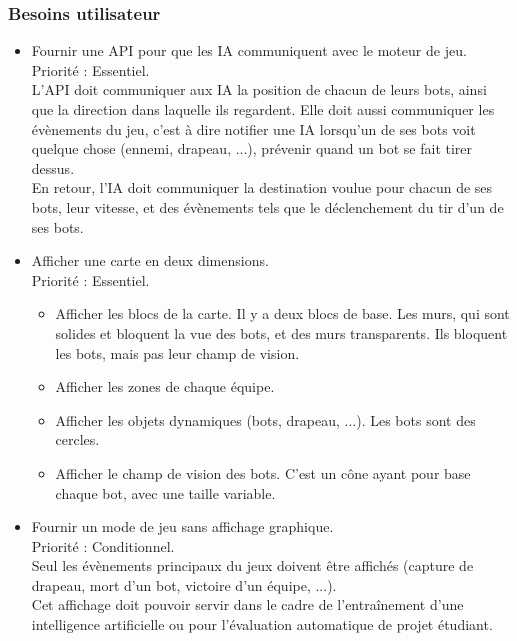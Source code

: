 \documentclass[french]{article}
\begin{document}
\subsubsection{Besoins utilisateur}
    \begin{itemize}
        \item Fournir une API pour que les IA communiquent avec le moteur de jeu. \\
                Priorité : Essentiel.\\
                L'API doit communiquer aux IA la position de chacun de leurs bots, ainsi que la direction dans laquelle ils regardent. Elle doit aussi communiquer les évènements du jeu, c'est à dire notifier une IA lorsqu'un de ses bots voit quelque chose (ennemi, drapeau, ...), prévenir quand un bot se fait tirer dessus.\\
                En retour, l'IA doit communiquer la destination voulue pour chacun de ses bots, leur vitesse, et des évènements tels que le déclenchement du tir d'un de ses bots.\\
                

        \item Afficher une carte en deux dimensions. \\
            Priorité : Essentiel.
            \begin{itemize}
                \item Afficher les blocs de la carte. Il y a deux blocs de base. Les murs, qui sont solides et bloquent la vue des bots, et des murs transparents. Ils bloquent les bots, mais pas leur champ de vision.
                \item Afficher les zones de chaque équipe.
                \item Afficher les objets dynamiques (bots, drapeau, ...). Les bots sont des cercles.
                \item Afficher le champ de vision des bots. C'est un cône ayant pour base chaque bot, avec une taille variable. \\
            \end{itemize}
            
        \item Fournir un mode de jeu sans affichage graphique. \\
            Priorité : Conditionnel.\\
            Seul les évènements principaux du jeux doivent être affichés (capture de drapeau, mort d'un bot, victoire d'un équipe, ...).\\
            Cet affichage doit pouvoir servir dans le cadre de l'entraînement d'une intelligence artificielle ou pour l'évaluation automatique de projet étudiant.\\


\end{itemize}
\end{document}
